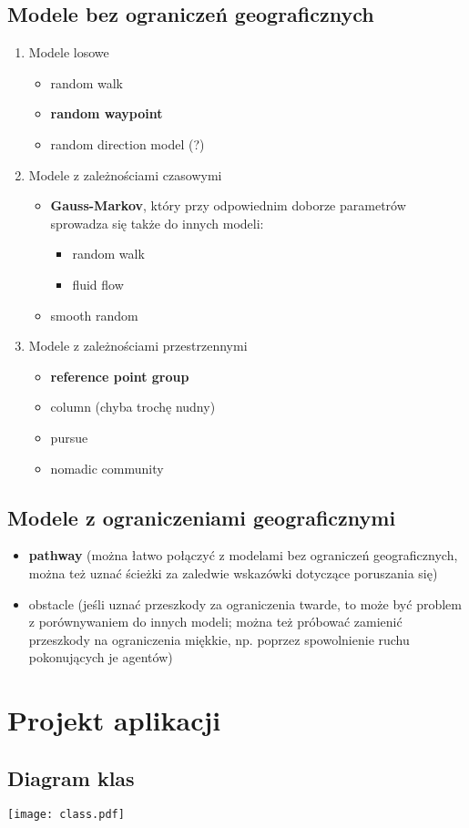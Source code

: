 \documentclass[a4paper,12pt]{article}
\begin{document}
\subsection{Modele bez ograniczeń geograficznych}

\begin{enumerate}
    \item Modele losowe
    \begin{itemize}
        \item random walk
        \item \textbf{random waypoint}
        \item random direction model (?)
    \end{itemize}
    \item Modele z zależnościami czasowymi
    \begin{itemize}
        \item \textbf{Gauss-Markov}, który przy odpowiednim doborze parametrów sprowadza się także do innych modeli:
        \begin{itemize}
            \item random walk
            \item fluid flow
        \end{itemize}
        \item smooth random
    \end{itemize}
    \item Modele z zależnościami przestrzennymi
    \begin{itemize}
        \item \textbf{reference point group}
        \item column (chyba trochę nudny)
        \item pursue
        \item nomadic community
    \end{itemize}
\end{enumerate}

\subsection{Modele z ograniczeniami geograficznymi}

\begin{itemize}
    \item \textbf{pathway} (można łatwo połączyć z modelami bez ograniczeń geograficznych, można też uznać ścieżki za zaledwie wskazówki dotyczące poruszania się)
    \item obstacle (jeśli uznać przeszkody za ograniczenia twarde, to może być problem z porównywaniem do innych modeli; można też próbować zamienić przeszkody na ograniczenia miękkie, np. poprzez spowolnienie ruchu pokonujących je agentów)
\end{itemize}

\section{Projekt aplikacji}

\subsection{Diagram klas}

\texttt{[image: class.pdf]}
\end{document}
